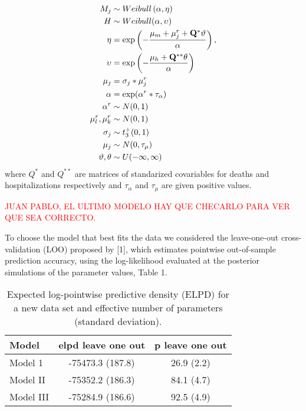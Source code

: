 \documentclass[10pt,letterpaper]{article}
\begin{document}
\[
\begin{aligned}
 M_j &\sim Weibull\left(\alpha, \mathbf{\eta} \right) \\
 H  &\sim Weibull(\alpha,\mathbf{\upsilon}) \\
 \mathbf{\eta} &= \exp \left(-\frac{\mu_m+\mathbf{\mu}_j^r+\mathbf{Q}^*\mathbf{\vartheta}}{\alpha} \right),\space\\
 \mathbf{\upsilon} &= \exp\left(-\frac{\mu_h+\mathbf{Q}^{**}\mathbf{\theta}}{\alpha}\right) \\
 \mathbf{\mu}_j&=\sigma_j*\mathbf{\mu}_j^r \\
 \alpha&=\exp(\alpha^r*\tau_\alpha) \\
 \alpha^r&\sim N(0,1) \\
 \mu^r_l,\mu^r_k &\sim N(0,1) \\
 \sigma_j&\sim t^+_3(0,1) \\
 \mu_j &\sim N(0,\tau_\mu) \\
 \mathbf{\vartheta},\mathbf{\theta} &\sim U(-\infty,\infty) \\
\end{aligned}
\] where \(Q^*\) and \(Q^{**}\) are matrices of standarized covariables
for deaths and hospitalizations respectively and \(\tau_\alpha\) and
\(\tau_{\mu}\) are given positive values. 

\textcolor{red}{JUAN PABLO, EL ULTIMO MODELO HAY QUE CHECARLO PARA VER QUE SEA CORRECTO.}



To choose the model that best fits the data we considered
the leave-one-out cross-validation (LOO) proposed by {[}1{]}, which
estimates pointwise out-of-sample prediction accuracy, using the
log-likelihood evaluated at the posterior simulations of the parameter
values, Table 1.

\begin{table}[!htb]
\centering
\begin{tabular}{lcc}
\hline
{\textbf{Model}} & {\textbf{elpd leave one out}} & {\textbf{p leave one out}} \\
\hline Model 1  &  -75473.3 (187.8) & 26.9 (2.2) \\
Model II          &   -75352.2 (186.3) &  84.1 (4.7)\\
Model III         &    -75284.9 (186.6) &  92.5 (4.9)  \\
\hline
\end{tabular}
\caption{\label{tab:gof} Expected log-pointwise predictive density (ELPD) for a new data set and effective number of parameters (standard deviation).}
\end{table}
\end{document}
